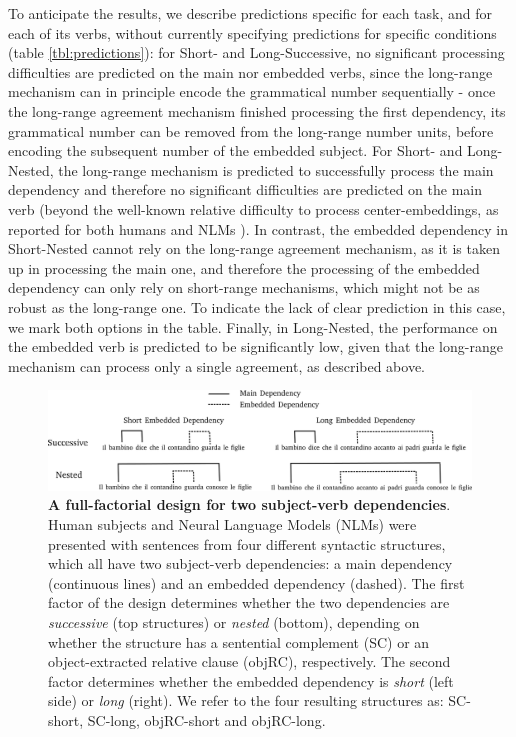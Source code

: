 To anticipate the results, we describe predictions specific for each task, and for each of its verbs, without currently specifying predictions for specific conditions (table \ref{tbl:predictions}): for Short- and Long-Successive, no significant processing difficulties are predicted on the main nor embedded verbs, since the long-range mechanism can in principle encode the grammatical number sequentially - once the long-range agreement mechanism finished processing the first dependency, its grammatical number can be removed from the long-range number units, before encoding the subsequent number of the embedded subject. For Short- and Long-Nested, the long-range mechanism is predicted to successfully process the main dependency and therefore no significant difficulties are predicted on the main verb (beyond the well-known relative difficulty to process center-embeddings, as reported for both humans \citep{traxler2002processing} and NLMs \citep{marvin2018targeted}). In contrast, the embedded dependency in Short-Nested cannot rely on the long-range agreement mechanism, as it is taken up in processing the main one, and therefore the processing of the embedded dependency can only rely on short-range mechanisms, which might not be as robust as the long-range one. To indicate the lack of clear prediction in this case, we mark both options in the table. Finally, in Long-Nested, the performance on the embedded verb is predicted to be significantly low, given that the long-range mechanism can process only a single agreement, as described above. 



\begin{figure}
    \centering
    \includegraphics[width=\textwidth]{figures/design.png}
    \caption{\textbf{A full-factorial design for two subject-verb dependencies}. Human subjects and Neural Language Models (NLMs) were presented with sentences from four different syntactic structures, which all have two subject-verb dependencies: a main dependency (continuous lines) and an embedded dependency (dashed). The first factor of the design determines whether the two dependencies are \textit{successive} (top structures) or \textit{nested} (bottom), depending on whether the structure has a sentential complement (SC) or an object-extracted relative clause (objRC), respectively. The second factor determines whether the embedded dependency is \textit{short} (left side) or \textit{long} (right). We refer to the four resulting structures as: SC-short, SC-long, objRC-short and objRC-long.}
    \label{fig:design}
\end{figure}
